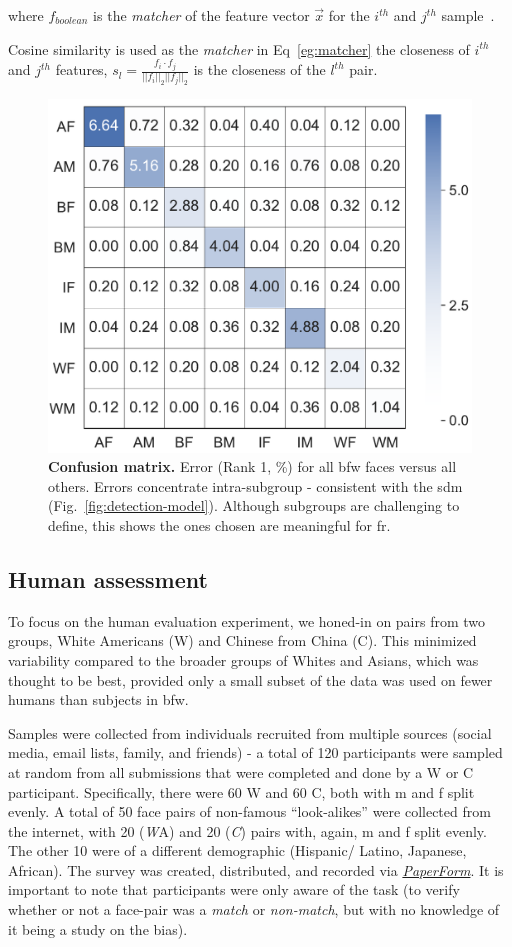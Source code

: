 where $f_{boolean}$ is the \textit{matcher} of the feature vector $\vec{x}$ for the $i^{th}$ and $j^{th}$ sample~\cite{LFWTech}.

Cosine similarity is used as the \emph{matcher} in Eq~\ref{eg:matcher} the closeness of $i^{th}$ and $j^{th}$ features, \ie
$
s_l= \frac{f_i\cdot f_j}{||f_i||_2||f_j||_2}
$ is the closeness of the $l^{th}$ pair. 

\begin{figure}[t!]
	\centering    
	\includegraphics[width=.65\linewidth]{figures/confusion.pdf}
		\caption{\small{\textbf{Confusion matrix.} Error (Rank 1, \%) for all \gls{bfw} faces versus all others. Errors concentrate intra-subgroup - consistent with the \gls{sdm} (Fig.~\ref{fig:detection-model}). Although subgroups are challenging to define, this shows the ones chosen are meaningful for \gls{fr}.}}
		\label{fig:confusion} 
\end{figure} 

\subsection{Human assessment}\label{subsec:human-assessment}
To focus on the human evaluation experiment, we honed-in on pairs from two groups, White Americans (W) and Chinese from China (C). This minimized variability compared to the broader groups of Whites and Asians, which was thought to be best, provided only a small subset of the data was used on fewer humans than subjects in \gls{bfw}.


Samples were collected from individuals recruited from multiple sources (\eg social media, email lists, family, and friends) - a total of 120 participants were sampled at random from all submissions that were completed and done by a W or C participant. Specifically, there were 60 W and 60 C, both with \gls{m} and \gls{f} split evenly. A total of 50 face pairs of non-famous ``look-alikes'' were collected from the internet, with 20 ({\emph WA}) and 20 ({\emph C}) pairs with, again, \gls{m} and \gls{f} split evenly. The other 10 were of a different demographic (\eg Hispanic/ Latino, Japanese, African). The survey was created, distributed, and recorded via \emph{\href{https://paperform.co}{PaperForm}}. It is important to note that participants were only aware of the task (\ie to verify whether or not a face-pair was a \emph{match} or \emph{non-match}, but with no knowledge of it being a study on the bias).
